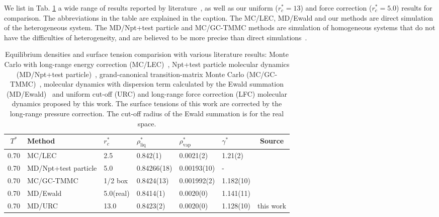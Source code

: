 \documentclass[aps,pre,preprint]{revtex4-1}
\begin{document}
We list in Tab. \ref{tab:comparison} a wide range of results reported
by literature~\cite{janecek2006long, lotfi1992vapour,
  errington2003evaluating, ismail2007application}, as well as our
uniform ($r_c^\ast = 13$) and force correction ($r_c^\ast = 5.0$)
results for comparison. The abbreviations in the table are explained
in the caption. The MC/LEC, MD/Ewald and our methods are direct
simulation of the heterogeneous system. The MD/Npt+test particle and
MC/GC-TMMC methods are simulation of homogeneous systems that do not
have the difficulties of heterogeneity, and are believed to be more
precise than direct simulations~\cite{shen2007comparative}.
\begin{table}
  \centering
  \caption{Equilibrium densities and surface tension comparision 
    with various literature results: Monte Carlo with long-range
    energy correction (MC/LEC)~\cite{janecek2006long}, Npt+test
    particle molecular dynamics (MD/Npt+test particle)~\cite{lotfi1992vapour},
    grand-canonical transition-matrix Monte Carlo (MC/GC-TMMC)~\cite{errington2003evaluating},
    molecular dynamics with dispersion term calculated by the Ewald
    summation (MD/Ewald)~\cite{ismail2007application}
    and uniform cut-off (URC) and long-range force correction (LFC) molecular dynamics
    proposed by this work. The surface tensions of this work are
    corrected by the long-range pressure correction.
    The cut-off radius of the Ewald summation is for the real space.
  }
  \label{tab:comparison}
  \begin{tabular*}{0.99\textwidth}{@{\extracolsep{\fill}}clllllc}\hline\hline
    $T^\ast$ & Method & $r_c^\ast$ & $\rho^\ast_{\textrm{liq}}$ & $\rho^\ast_{\textrm{vap}}$ & $\gamma^\ast$ & Source \\\hline
    0.70 & MC/LEC               & 2.5      & 0.842(1)    & 0.0021(2)   & 1.21(2)   & \cite{janecek2006long}\\
    0.70 & MD/Npt+test particle & 5.0      & 0.84266(18) & 0.00193(10) & -         & \cite{lotfi1992vapour}\\
    0.70 & MC/GC-TMMC           & 1/2 box  & 0.8424(13)  & 0.001992(2) & 1.182(10) & \cite{errington2003evaluating}\\
    0.70 & MD/Ewald             & 5.0(real)& 0.8414(1)   & 0.0020(0)   & 1.141(11) & \cite{ismail2007application}\\
    0.70 & MD/URC               & 13.0     & 0.8423(2)   & 0.0020(0)   & 1.128(10) & this work \\

\end{tabular*}
\end{table}
\end{document}
